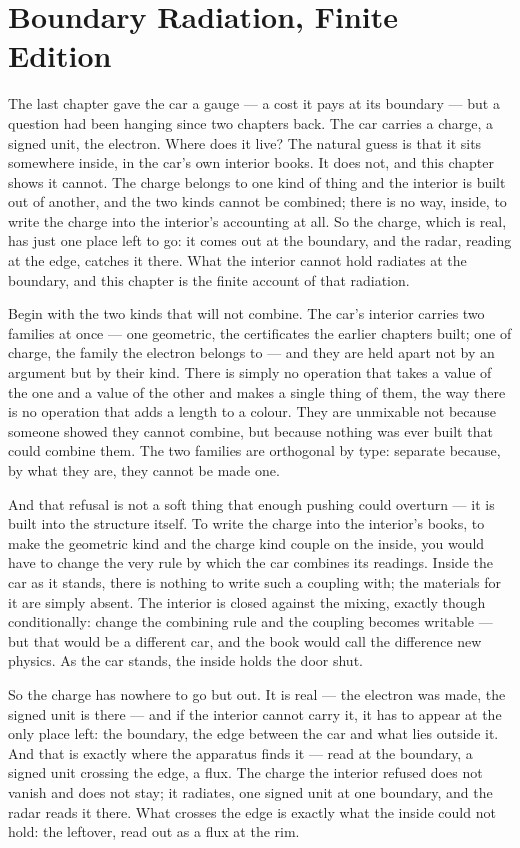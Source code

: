 \chapter{Boundary Radiation, Finite Edition}

The last chapter gave the car a gauge --- a cost it pays at its boundary --- but a question had been hanging since two chapters back. The car carries a charge, a signed unit, the electron. Where does it live? The natural guess is that it sits somewhere inside, in the car's own interior books. It does not, and this chapter shows it cannot. The charge belongs to one kind of thing and the interior is built out of another, and the two kinds cannot be combined; there is no way, inside, to write the charge into the interior's accounting at all. So the charge, which is real, has just one place left to go: it comes out at the boundary, and the radar, reading at the edge, catches it there. What the interior cannot hold radiates at the boundary, and this chapter is the finite account of that radiation.

Begin with the two kinds that will not combine. The car's interior carries two families at once --- one geometric, the certificates the earlier chapters built; one of charge, the family the electron belongs to --- and they are held apart not by an argument but by their kind. There is simply no operation that takes a value of the one and a value of the other and makes a single thing of them, the way there is no operation that adds a length to a colour. They are unmixable not because someone showed they cannot combine, but because nothing was ever built that could combine them. The two families are orthogonal by type: separate because, by what they are, they cannot be made one.

And that refusal is not a soft thing that enough pushing could overturn --- it is built into the structure itself. To write the charge into the interior's books, to make the geometric kind and the charge kind couple on the inside, you would have to change the very rule by which the car combines its readings. Inside the car as it stands, there is nothing to write such a coupling with; the materials for it are simply absent. The interior is closed against the mixing, exactly though conditionally: change the combining rule and the coupling becomes writable --- but that would be a different car, and the book would call the difference new physics. As the car stands, the inside holds the door shut.

So the charge has nowhere to go but out. It is real --- the electron was made, the signed unit is there --- and if the interior cannot carry it, it has to appear at the only place left: the boundary, the edge between the car and what lies outside it. And that is exactly where the apparatus finds it --- read at the boundary, a signed unit crossing the edge, a flux. The charge the interior refused does not vanish and does not stay; it radiates, one signed unit at one boundary, and the radar reads it there. What crosses the edge is exactly what the inside could not hold: the leftover, read out as a flux at the rim.

